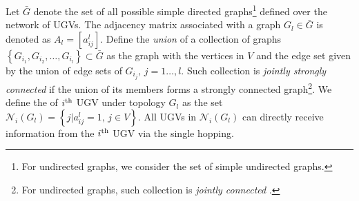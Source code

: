 	Let $\bar{G}$ denote the set of all possible simple directed graphs\footnote{For undirected graphs, we consider the set of simple undirected graphs.} defined over the network of UGVs.
	The adjacency matrix associated with a graph $G_l\in\bar{G}$ is denoted as $A_l=[a^l_{ij}]$.	
	Define the \textit{union} of a collection of graphs $\left\lbrace G_{i_1},G_{i_2},\dots,G_{i_l} \right\rbrace \subset \bar{G}$ as the graph with the vertices in $V$ and the edge set given by the union of edge sets of $G_{i_j},\,j=1\dots,l$.
	Such collection is \textit{jointly strongly connected} if the union of its members forms a strongly connected graph\footnote{For undirected graphs, such collection is \textit{jointly connected} \cite{jadbabaie2003coordination}.}.
	We define the \textit{\dnbhd} of $i^\text{th}$ UGV under topology $G_{l}$ as the set $\mathcal{N}_i(G_{l})=\left\lbrace j|a^l_{ij}=1,\,j\in V\right\rbrace $. %
	All UGVs in $\mathcal{N}_i(G_{l})$ can directly receive information from the $i^\text{th}$ UGV via the single hopping.
